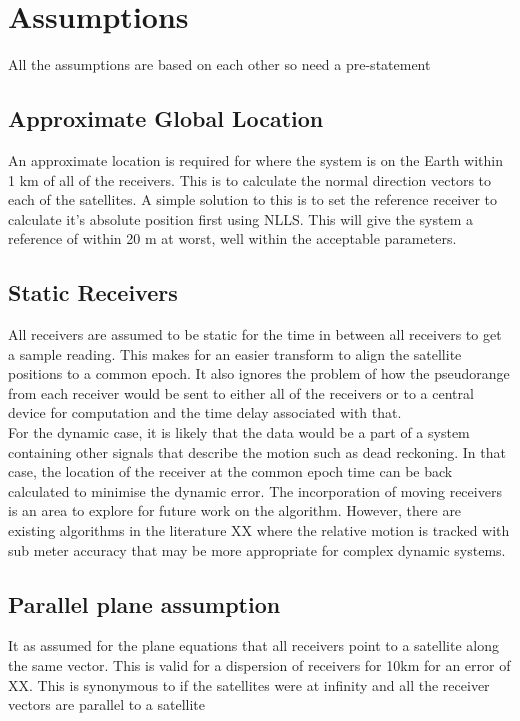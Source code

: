 
\section{Assumptions}
All the assumptions are based on each other so need a pre-statement

\subsection{Approximate Global Location}
An approximate location is required for where the system is on the Earth within 1 km of all of the receivers. This is to calculate the normal direction vectors to each of the satellites. A simple solution to this is to set the reference receiver to calculate it's absolute position first using NLLS. This will give the system a reference of within 20 m at worst, well within the acceptable parameters.


\subsection{Static Receivers}
All receivers are assumed to be static for the time in between all receivers to get a sample reading. This makes for an easier transform to align the satellite positions to a common epoch. It also ignores the problem of how the pseudorange from each receiver would be sent to either all of the receivers or to a central device for computation and the time delay associated with that. \\

For the dynamic case, it is likely that the data would be a part of a system containing other signals that describe the motion such as dead reckoning. In that case, the location of the receiver at the common epoch time can be back calculated to minimise the dynamic error. The incorporation of moving receivers is an area to explore for future work on the algorithm. However, there are existing algorithms in the literature XX where the relative motion is tracked with sub meter accuracy that may be more appropriate for complex dynamic systems.


\subsection{Parallel plane assumption}
It as assumed for the plane equations that all receivers point to a satellite along the same vector. This is valid for a dispersion of receivers for 10km for an error of XX. This is synonymous to if the satellites were at infinity and all the receiver vectors are parallel to a satellite


